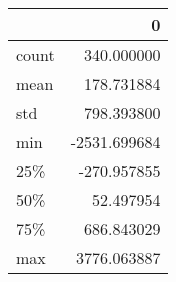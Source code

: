 \begin{tabular}{lr}
\toprule
{} &            0 \\
\midrule
count &   340.000000 \\
mean  &   178.731884 \\
std   &   798.393800 \\
min   & -2531.699684 \\
25\%   &  -270.957855 \\
50\%   &    52.497954 \\
75\%   &   686.843029 \\
max   &  3776.063887 \\
\bottomrule
\end{tabular}
